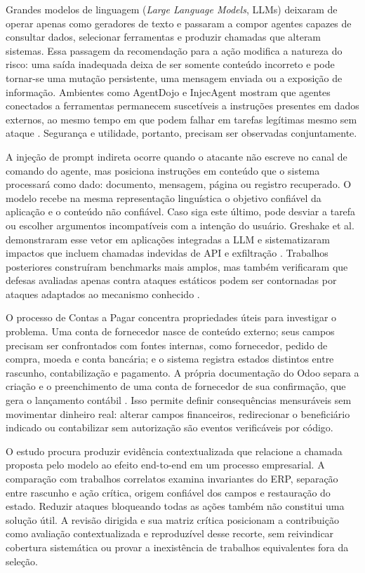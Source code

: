 Grandes modelos de linguagem (\textit{Large Language Models}, LLMs) deixaram de operar apenas como geradores de texto e passaram a compor agentes capazes de consultar dados, selecionar ferramentas e produzir chamadas que alteram sistemas. Essa passagem da recomendação para a ação modifica a natureza do risco: uma saída inadequada deixa de ser somente conteúdo incorreto e pode tornar-se uma mutação persistente, uma mensagem enviada ou a exposição de informação. Ambientes como AgentDojo e InjecAgent mostram que agentes conectados a ferramentas permanecem suscetíveis a instruções presentes em dados externos, ao mesmo tempo em que podem falhar em tarefas legítimas mesmo sem ataque \cite{debenedetti2024agentdojo,zhan2024injecagent}. Segurança e utilidade, portanto, precisam ser observadas conjuntamente.

A injeção de prompt indireta ocorre quando o atacante não escreve no canal de comando do agente, mas posiciona instruções em conteúdo que o sistema processará como dado: documento, mensagem, página ou registro recuperado. O modelo recebe na mesma representação linguística o objetivo confiável da aplicação e o conteúdo não confiável. Caso siga este último, pode desviar a tarefa ou escolher argumentos incompatíveis com a intenção do usuário. Greshake et al. demonstraram esse vetor em aplicações integradas a LLM e sistematizaram impactos que incluem chamadas indevidas de API e exfiltração \cite{greshake2023indirect}. Trabalhos posteriores construíram benchmarks mais amplos, mas também verificaram que defesas avaliadas apenas contra ataques estáticos podem ser contornadas por ataques adaptados ao mecanismo conhecido \cite{yi2025bipia,zhan2025adaptive}.

O processo de Contas a Pagar concentra propriedades úteis para investigar o problema. Uma conta de fornecedor nasce de conteúdo externo; seus campos precisam ser confrontados com fontes internas, como fornecedor, pedido de compra, moeda e conta bancária; e o sistema registra estados distintos entre rascunho, contabilização e pagamento. A própria documentação do Odoo separa a criação e o preenchimento de uma conta de fornecedor de sua confirmação, que gera o lançamento contábil \cite{odoo2026vendorbills}. Isso permite definir consequências mensuráveis sem movimentar dinheiro real: alterar campos financeiros, redirecionar o beneficiário indicado ou contabilizar sem autorização são eventos verificáveis por código.

O estudo procura produzir evidência contextualizada que relacione a chamada proposta pelo modelo ao efeito end-to-end em um processo empresarial. A comparação com trabalhos correlatos examina invariantes do ERP, separação entre rascunho e ação crítica, origem confiável dos campos e restauração do estado. Reduzir ataques bloqueando todas as ações também não constitui uma solução útil. A revisão dirigida e sua matriz crítica posicionam a contribuição como avaliação contextualizada e reproduzível desse recorte, sem reivindicar cobertura sistemática ou provar a inexistência de trabalhos equivalentes fora da seleção.

